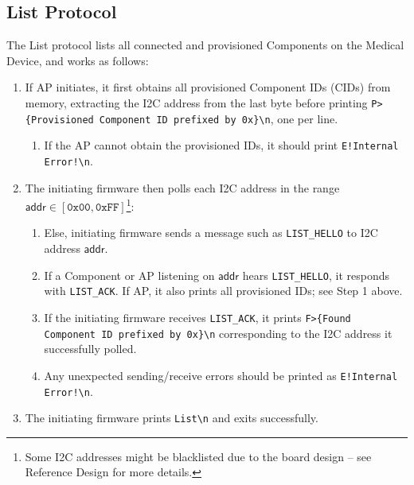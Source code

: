 \subsection{List Protocol}


The List protocol lists all connected and provisioned Components on the Medical Device, and works as follows:
\iflong
\begin{enumerate}
    \item If AP initiates, it first obtains all provisioned Component IDs (CIDs) from memory, extracting the I2C address from the last byte before printing \texttt{P>\{Provisioned Component ID prefixed by 0x\}\textbackslash n}, one per line.
    \begin{enumerate}
        \item If the AP cannot obtain the provisioned IDs, it should print \texttt{E!Internal Error!\textbackslash n}.%
    \end{enumerate}
    \item The initiating firmware then polls each I2C address in the range $\mathsf{addr} \in [\texttt{0x00}, \texttt{0xFF}]$\footnote{Some I2C addresses might be blacklisted due to the board design -- see Reference Design for more details.}:
    \begin{enumerate}
        \item Else, initiating firmware sends a message such as \texttt{LIST\_HELLO} to I2C address $\mathsf{addr}$.
        \item If a Component or AP listening on $\mathsf{addr}$ hears \texttt{LIST\_HELLO}, it responds with \texttt{LIST\_ACK}. If AP, it also prints all provisioned IDs; see Step 1 above.
        \item If the initiating firmware receives \texttt{LIST\_ACK}, it prints \texttt{F>\{Found Component ID prefixed by 0x\}\textbackslash n} corresponding to the I2C address it successfully polled.
        \item Any unexpected sending/receive errors should be printed as \texttt{E!Internal Error!\textbackslash n}.%
    \end{enumerate}
    \item The initiating firmware prints \texttt{List\textbackslash n} and exits successfully.
\end{enumerate}

